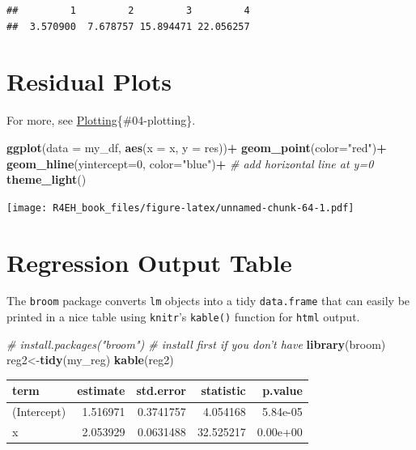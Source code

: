 \documentclass[]{book}
\newenvironment{Shaded}{\begin{snugshade}}{\end{snugshade}}
\newcommand{\KeywordTok}[1]{\textcolor[rgb]{0.13,0.29,0.53}{\textbf{#1}}}
\newcommand{\DataTypeTok}[1]{\textcolor[rgb]{0.13,0.29,0.53}{#1}}
\newcommand{\DecValTok}[1]{\textcolor[rgb]{0.00,0.00,0.81}{#1}}
\newcommand{\StringTok}[1]{\textcolor[rgb]{0.31,0.60,0.02}{#1}}
\newcommand{\CommentTok}[1]{\textcolor[rgb]{0.56,0.35,0.01}{\textit{#1}}}
\newcommand{\OperatorTok}[1]{\textcolor[rgb]{0.81,0.36,0.00}{\textbf{#1}}}
\newcommand{\NormalTok}[1]{#1}
\theoremstyle{definition}
\theoremstyle{definition}
\theoremstyle{definition}
\theoremstyle{remark}
\begin{document}
\begin{verbatim}
##         1         2         3         4 
##  3.570900  7.678757 15.894471 22.056257
\end{verbatim}

\section{Residual Plots}\label{residual-plots}

For more, see \protect\hyperlink{plotting}{Plotting}\{\#04-plotting\}.

\begin{Shaded}
\begin{Highlighting}[]
\KeywordTok{ggplot}\NormalTok{(}\DataTypeTok{data =}\NormalTok{ my_df, }\KeywordTok{aes}\NormalTok{(}\DataTypeTok{x =}\NormalTok{ x, }\DataTypeTok{y =}\NormalTok{ res))}\OperatorTok{+}
\StringTok{  }\KeywordTok{geom_point}\NormalTok{(}\DataTypeTok{color=}\StringTok{"red"}\NormalTok{)}\OperatorTok{+}
\StringTok{  }\KeywordTok{geom_hline}\NormalTok{(}\DataTypeTok{yintercept=}\DecValTok{0}\NormalTok{, }\DataTypeTok{color=}\StringTok{"blue"}\NormalTok{)}\OperatorTok{+}\StringTok{ }\CommentTok{# add horizontal line at y=0}
\StringTok{  }\KeywordTok{theme_light}\NormalTok{()}
\end{Highlighting}
\end{Shaded}

\texttt{[image: R4EH\_book\_files/figure-latex/unnamed-chunk-64-1.pdf]}

\section{Regression Output Table}\label{regression-output-table}

The \texttt{broom} package converts \texttt{lm} objects into a tidy
\texttt{data.frame} that can easily be printed in a nice table using
\texttt{knitr}'s \texttt{kable()} function for \texttt{html} output.

\begin{Shaded}
\begin{Highlighting}[]
\CommentTok{# install.packages("broom") # install first if you don't have }
\KeywordTok{library}\NormalTok{(broom)}
\NormalTok{reg2<-}\KeywordTok{tidy}\NormalTok{(my_reg)}
\KeywordTok{kable}\NormalTok{(reg2)}
\end{Highlighting}
\end{Shaded}

\begin{tabular}{l|r|r|r|r}
\hline
term & estimate & std.error & statistic & p.value\\
\hline
(Intercept) & 1.516971 & 0.3741757 & 4.054168 & 5.84e-05\\
\hline
x & 2.053929 & 0.0631488 & 32.525217 & 0.00e+00\\
\hline
\end{tabular}
\end{document}
